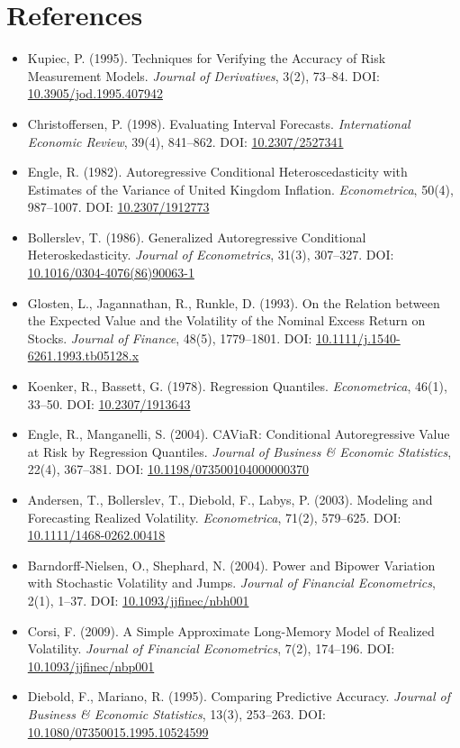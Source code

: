 \documentclass[11pt]{article}
\begin{document}
\section{References}
\begin{itemize}
\item Kupiec, P. (1995). Techniques for Verifying the Accuracy of Risk Measurement Models. \emph{Journal of Derivatives}, 3(2), 73--84. DOI: \url{10.3905/jod.1995.407942}
\item Christoffersen, P. (1998). Evaluating Interval Forecasts. \emph{International Economic Review}, 39(4), 841--862. DOI: \url{10.2307/2527341}
\item Engle, R. (1982). Autoregressive Conditional Heteroscedasticity with Estimates of the Variance of United Kingdom Inflation. \emph{Econometrica}, 50(4), 987--1007. DOI: \url{10.2307/1912773}
\item Bollerslev, T. (1986). Generalized Autoregressive Conditional Heteroskedasticity. \emph{Journal of Econometrics}, 31(3), 307--327. DOI: \url{10.1016/0304-4076(86)90063-1}
\item Glosten, L., Jagannathan, R., Runkle, D. (1993). On the Relation between the Expected Value and the Volatility of the Nominal Excess Return on Stocks. \emph{Journal of Finance}, 48(5), 1779--1801. DOI: \url{10.1111/j.1540-6261.1993.tb05128.x}
\item Koenker, R., Bassett, G. (1978). Regression Quantiles. \emph{Econometrica}, 46(1), 33--50. DOI: \url{10.2307/1913643}
\item Engle, R., Manganelli, S. (2004). CAViaR: Conditional Autoregressive Value at Risk by Regression Quantiles. \emph{Journal of Business \& Economic Statistics}, 22(4), 367--381. DOI: \url{10.1198/073500104000000370}
\item Andersen, T., Bollerslev, T., Diebold, F., Labys, P. (2003). Modeling and Forecasting Realized Volatility. \emph{Econometrica}, 71(2), 579--625. DOI: \url{10.1111/1468-0262.00418}
\item Barndorff-Nielsen, O., Shephard, N. (2004). Power and Bipower Variation with Stochastic Volatility and Jumps. \emph{Journal of Financial Econometrics}, 2(1), 1--37. DOI: \url{10.1093/jjfinec/nbh001}
\item Corsi, F. (2009). A Simple Approximate Long-Memory Model of Realized Volatility. \emph{Journal of Financial Econometrics}, 7(2), 174--196. DOI: \url{10.1093/jjfinec/nbp001}
\item Diebold, F., Mariano, R. (1995). Comparing Predictive Accuracy. \emph{Journal of Business \& Economic Statistics}, 13(3), 253--263. DOI: \url{10.1080/07350015.1995.10524599}

\end{itemize}
\end{document}
